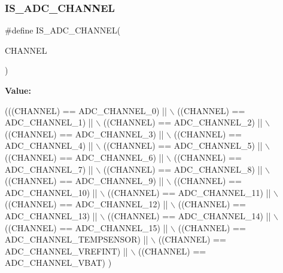 \subsubsection{\texorpdfstring{I\+S\+\_\+\+A\+D\+C\+\_\+\+C\+H\+A\+N\+N\+EL}{IS\_ADC\_CHANNEL}}
{\footnotesize\ttfamily \#define I\+S\+\_\+\+A\+D\+C\+\_\+\+C\+H\+A\+N\+N\+EL(\begin{DoxyParamCaption}\item[{}]{C\+H\+A\+N\+N\+EL }\end{DoxyParamCaption})}

{\bfseries Value\+:}
\begin{DoxyCode}
(((CHANNEL) == ADC\_CHANNEL\_0)           || \(\backslash\)
                                 ((CHANNEL) == ADC\_CHANNEL\_1)           || \(\backslash\)
                                 ((CHANNEL) == ADC\_CHANNEL\_2)           || \(\backslash\)
                                 ((CHANNEL) == ADC\_CHANNEL\_3)           || \(\backslash\)
                                 ((CHANNEL) == ADC\_CHANNEL\_4)           || \(\backslash\)
                                 ((CHANNEL) == ADC\_CHANNEL\_5)           || \(\backslash\)
                                 ((CHANNEL) == ADC\_CHANNEL\_6)           || \(\backslash\)
                                 ((CHANNEL) == ADC\_CHANNEL\_7)           || \(\backslash\)
                                 ((CHANNEL) == ADC\_CHANNEL\_8)           || \(\backslash\)
                                 ((CHANNEL) == ADC\_CHANNEL\_9)           || \(\backslash\)
                                 ((CHANNEL) == ADC\_CHANNEL\_10)          || \(\backslash\)
                                 ((CHANNEL) == ADC\_CHANNEL\_11)          || \(\backslash\)
                                 ((CHANNEL) == ADC\_CHANNEL\_12)          || \(\backslash\)
                                 ((CHANNEL) == ADC\_CHANNEL\_13)          || \(\backslash\)
                                 ((CHANNEL) == ADC\_CHANNEL\_14)          || \(\backslash\)
                                 ((CHANNEL) == ADC\_CHANNEL\_15)          || \(\backslash\)
                                 ((CHANNEL) == ADC\_CHANNEL\_TEMPSENSOR)  || \(\backslash\)
                                 ((CHANNEL) == ADC\_CHANNEL\_VREFINT)     || \(\backslash\)
                                 ((CHANNEL) == ADC\_CHANNEL\_VBAT)          )
\end{DoxyCode}
\mbox{\label{group___a_d_c_ex___private___macros_gab3f646d603911820b104dd134c42f028}} 

